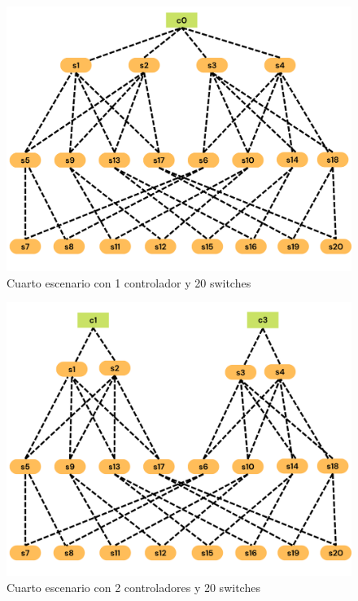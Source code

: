 \documentclass[a4paper, 12pt]{book}
\begin{document}
	\begin{figure}[H]
		\centering
		\includegraphics[width=16cm, keepaspectratio]{img/e4_1}
		\caption{Cuarto escenario con 1 controlador y 20 switches}
		\label{figura:e4_1}
	\end{figure}
	
	\begin{figure}[H]
		\centering
		\includegraphics[width=13cm, keepaspectratio]{img/e4_2}
		\caption{Cuarto escenario con 2 controladores y 20 switches}
		\label{figura:e4_2}
	\end{figure}
	
\end{document}
